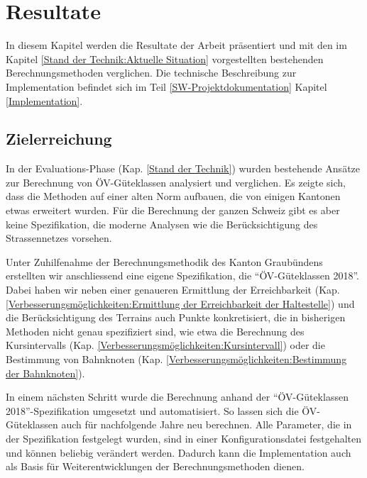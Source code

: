 
\section{Resultate}
\label{Resultate}

In diesem Kapitel werden die Resultate der Arbeit präsentiert und mit den im Kapitel \ref{Stand der Technik:Aktuelle Situation} vorgestellten bestehenden Berechnungsmethoden verglichen.
Die technische Beschreibung zur Implementation befindet sich im Teil \ref{SW-Projektdokumentation} Kapitel \ref{Implementation}.

\subsection{Zielerreichung}
\label{Resultate:Zielerreichung}

In der Evaluations-Phase (Kap. \ref{Stand der Technik}) wurden bestehende Ansätze zur Berechnung von \acs{ÖV}-Güteklassen analysiert und verglichen.
Es zeigte sich, dass die Methoden auf einer alten Norm aufbauen, die von einigen Kantonen etwas erweitert wurden.
Für die Berechnung der ganzen Schweiz gibt es aber keine Spezifikation, die moderne Analysen wie die Berücksichtigung des Strassennetzes vorsehen.

Unter Zuhilfenahme der Berechnungsmethodik des Kanton Graubündens erstellten wir anschliessend eine eigene Spezifikation, die "`\acs{ÖV}-Güteklassen 2018"'.
Dabei haben wir neben einer genaueren Ermittlung der Erreichbarkeit (Kap. \ref{Verbesserungsmöglichkeiten:Ermittlung der Erreichbarkeit der Haltestelle}) und die Berücksichtigung des Terrains auch Punkte konkretisiert, die in bisherigen Methoden nicht genau spezifiziert sind, wie etwa die Berechnung des Kursintervalls (Kap. \ref{Verbesserungsmöglichkeiten:Kursintervall}) oder die Bestimmung von Bahnknoten (Kap. \ref{Verbesserungsmöglichkeiten:Bestimmung der Bahnknoten}).

In einem nächsten Schritt wurde die Berechnung anhand der "`\acs{ÖV}-Güteklassen 2018"'-Spezifikation umgesetzt und automatisiert.
So lassen sich die \acs{ÖV}-Güteklassen auch für nachfolgende Jahre neu berechnen.
Alle Parameter, die in der Spezifikation festgelegt wurden, sind in einer Konfigurationsdatei festgehalten und können beliebig verändert werden.
Dadurch kann die Implementation auch als Basis für Weiterentwicklungen der Berechnungsmethoden dienen.


